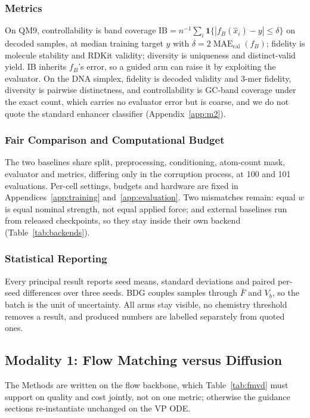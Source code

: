 \documentclass{article}
\newcommand{\Fbar}{\bar F}
\newcommand{\Vb}{V_b}
\newcommand{\IB}{\mathrm{IB}}
\begin{document}
\subsubsection{Metrics}
On QM9, controllability is band coverage $\IB=n^{-1}\sum_i\mathbf1\{|f_B(\hat x_i)-y|\le\delta\}$ on decoded samples, at median training target $y$ with $\delta=2\operatorname{MAE}_{\mathrm{cal}}(f_B)$; fidelity is molecule stability and RDKit validity; diversity is uniqueness and distinct-valid yield. IB inherits $f_B$'s error, so a guided arm can raise it by exploiting the evaluator. On the DNA simplex, fidelity is decoded validity and 3-mer fidelity, diversity is pairwise distinctness, and controllability is GC-band coverage under the exact count, which carries no evaluator error but is coarse, and we do not quote the standard enhancer classifier (Appendix~\ref{app:m2}).

\subsubsection{Fair Comparison and Computational Budget}
The two baselines share split, preprocessing, conditioning, atom-count mask, evaluator and metrics, differing only in the corruption process, at 100 and 101 evaluations. Per-cell settings, budgets and hardware are fixed in Appendices~\ref{app:training} and~\ref{app:evaluation}. Two mismatches remain: equal $w$ is equal nominal strength, not equal applied force; and external baselines run from released checkpoints, so they stay inside their own backend (Table~\ref{tab:backends}).

\subsubsection{Statistical Reporting}
Every principal result reports seed means, standard deviations and paired per-seed differences over three seeds. BDG couples samples through $\Fbar$ and $\Vb$, so the batch is the unit of uncertainty. All arms stay visible, no chemistry threshold removes a result, and produced numbers are labelled separately from quoted ones.

\subsection{Modality 1: Flow Matching versus Diffusion}\label{sec:fmvd}
The Methods are written on the flow backbone, which Table~\ref{tab:fmvd} must support on quality and cost jointly, not on one metric; otherwise the guidance sections re-instantiate unchanged on the VP ODE.
\end{document}
